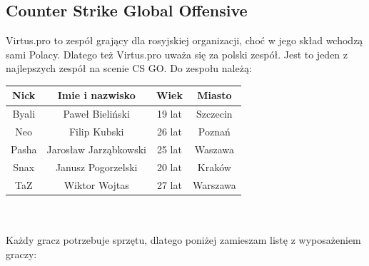 \documentclass{article}
\begin{document}
\subsection{Counter Strike Global Offensive}
Virtus.pro to zespół grający dla rosyjskiej organizacji, choć w jego skład wchodzą sami Polacy. Dlatego też Virtus.pro uważa się za polski zespół. Jest to jeden z najlepszych zespół na scenie CS GO. Do zespołu należą:\\
\begin{tabular}{|c|c|c|c|} \hline
Nick & Imie i nazwisko & Wiek & Miasto\\
\hline
Byali & Paweł Bieliński & 19 lat & Szczecin\\
\hline
Neo & Filip Kubski & 26 lat & Poznań\\
\hline
Pasha & Jarosław Jarząbkowski & 25 lat & Waszawa\\
\hline
Snax & Janusz Pogorzelski & 20 lat & Kraków\\
\hline
TaZ & Wiktor Wojtas & 27 lat & Warszawa\\
\hline
\end{tabular}\\ \\
Każdy gracz potrzebuje sprzętu, dlatego poniżej zamieszam listę z wyposażeniem graczy:
\end{document}
